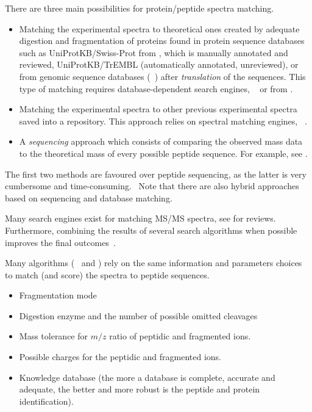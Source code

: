 There are three main possibilities for protein/peptide spectra matching.
\begin{itemize}
    \item Matching the experimental spectra to theoretical ones created by
        adequate  digestion
        and fragmentation of proteins found in protein sequence databases such as
        UniProtKB/Swiss-Prot from ,
        which is manually annotated and reviewed,
        UniProtKB/TrEMBL (automatically annotated, unreviewed), or
        from genomic sequence databases (\eg\ )
        after \emph{ translation} of the sequences.
        This type of matching requires database-dependent search engines,
        \eg\ 
        or  from .
    \item Matching the experimental spectra to other previous experimental spectra
        saved into a repository.
        This approach relies on spectral matching engines,
        \eg\ .
    \item A  \emph{sequencing} approach which consists of
        comparing the observed mass data to the theoretical mass
        of every possible peptide sequence.
        For example, see .
\end{itemize}

The first two methods are favoured over  peptide sequencing,
as the latter is very cumbersome and time-consuming.~
Note that there are also hybrid approaches based on  sequencing and
database matching.

Many search engines exist for matching \gls{MS/MS} spectra,
see \citet{Griss2016,Shteynberg2013,Eng2011} for reviews.
Furthermore\label{seg:moreAlgoisbetter},
combining the results of several search algorithms when possible improves
the final outcomes~.

Many algorithms (\eg\  and ) rely on
the same information and parameters choices to match
(and score) the spectra to peptide sequences.
\begin{itemize}[topsep=0pt,nosep]
    \item Fragmentation mode
    \item Digestion enzyme and the number of possible omitted cleavages
    \item Mass tolerance for $m/z$ ratio of peptidic and fragmented ions.
    \item Possible charges for the peptidic and fragmented ions.
    \item Knowledge database (the more a database is complete, accurate and adequate,
       the better and more robust is the peptide and protein identification).
\end{itemize}

